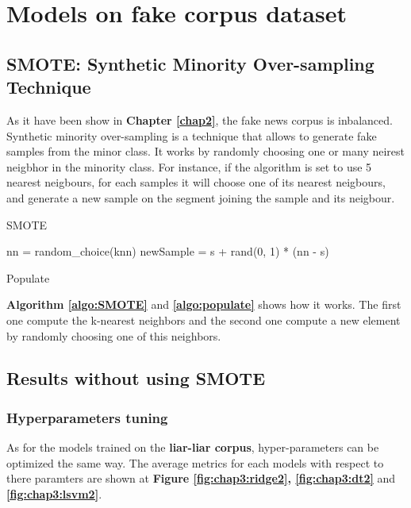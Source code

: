 \section{Models on fake corpus dataset}
\subsection{SMOTE: Synthetic Minority Over-sampling Technique\cite{Chawla2011}}
As it have been show in \textbf{Chapter \ref{chap2}}, the fake news corpus is inbalanced. Synthetic minority over-sampling is a technique that allows to generate fake samples from the minor class. It works by randomly choosing one or many neirest neigbhor in the minority class. For instance, if the algorithm is set to use 5 nearest neigbours, for each samples it will choose one of its nearest neigbours, and generate a new sample on the segment joining the sample and its neigbour. 

\begin{algorithm}
	 \caption{SMOTE}
	 \label{algo:SMOTE}
\end{algorithm}

\begin{algorithm}
	nn = random\_choice(knn)\;
	newSample = s + rand(0, 1) * (nn - s)\;
	\caption{Populate}
	\label{algo:populate}
\end{algorithm}

\textbf{Algorithm \ref{algo:SMOTE}} and \textbf{\ref{algo:populate}} shows how it works. The first one compute the k-nearest neighbors and the second one compute a new element by randomly choosing one of this neighbors. 

\subsection{Results without using SMOTE}
\subsubsection{Hyperparameters tuning}
As for the models trained on the \textbf{liar-liar corpus}, hyper-parameters can be optimized the same way. The average metrics for each models with respect to there paramters are shown at \textbf{Figure \ref{fig:chap3:ridge2}, \ref{fig:chap3:dt2}} and \textbf{\ref{fig:chap3:lsvm2}}. \\

